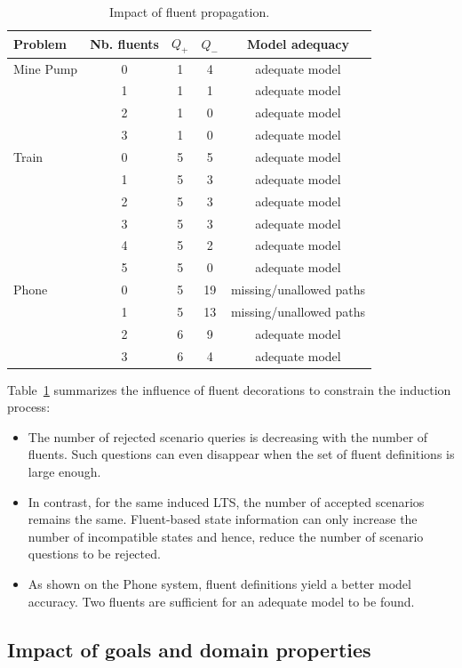 \begin{table}[H]
\centering
\begin{tabular}{|l||c||c|c|c|}\hline
Problem&Nb. fluents&$Q_+$&$Q_-$&Model adequacy\\\hline\hline
Mine Pump&0&1&4&adequate model\\\cline{2-5}
&1&1&1&adequate model\\\cline{2-5}
&2&1&0&adequate model\\\cline{2-5}
&3&1&0&adequate model\\\hline\hline
Train&0&5&5&adequate model\\\cline{2-5}
&1&5&3&adequate model\\\cline{2-5}
&2&5&3&adequate model\\\cline{2-5}
&3&5&3&adequate model\\\cline{2-5}
&4&5&2&adequate model\\\cline{2-5}
&5&5&0&adequate model\\\hline\hline
Phone&0&5&19&missing/unallowed paths\\\cline{2-5}
&1&5&13&missing/unallowed paths\\\cline{2-5}
&2&6&9&adequate model\\\cline{2-5}
&3&6&4&adequate model\\\hline
\end{tabular}
\caption{Impact of fluent propagation.\label{Fluents:res}}
\end{table}

Table~\ref{Fluents:res} summarizes the influence of fluent decorations to constrain the induction process:
\begin{itemize}
\item The number of rejected scenario queries is decreasing with the number of fluents. Such questions can even disappear when the set of fluent definitions is large enough. 
\item In contrast, for the same induced LTS, the number of accepted scenarios remains the same. Fluent-based state information can only increase the number of incompatible states and hence, reduce the number of scenario questions to be rejected.
\item As shown on the Phone system, fluent definitions yield a better model accuracy. Two fluents are sufficient for an adequate model to be found.
\end{itemize}


\subsection{Impact of goals and domain properties}

